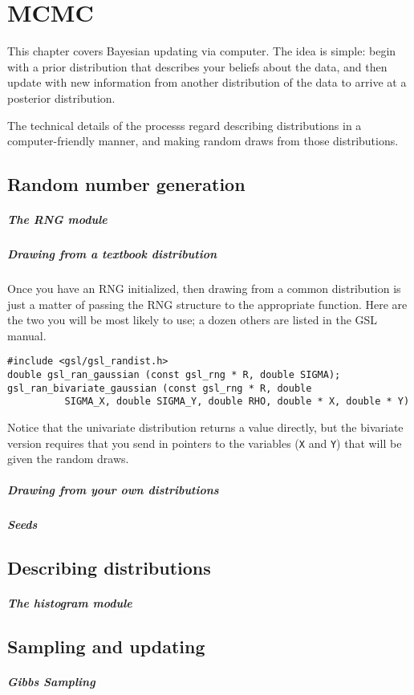 \chapter{MCMC}

This chapter covers Bayesian updating via computer. The idea is simple: begin with a prior
distribution that describes your beliefs about the data, and then update with new
information from another distribution of the data to arrive at a posterior distribution.

The technical details of the processs regard describing distributions
in a computer-friendly manner, and making random draws from those distributions.

\section{Random number generation}

\paragraph{The RNG module}

\paragraph{Drawing from a textbook distribution}
\label{randomnumbers}
Once you have an RNG initialized, then drawing from a common distribution is just a matter
of passing the RNG structure to the appropriate function. Here are the two you will be most
likely to use; a dozen others are listed in the GSL manual.
\begin{verbatim}
#include <gsl/gsl_randist.h>
double gsl_ran_gaussian (const gsl_rng * R, double SIGMA);
gsl_ran_bivariate_gaussian (const gsl_rng * R, double
          SIGMA_X, double SIGMA_Y, double RHO, double * X, double * Y)
\end{verbatim}
Notice that the univariate distribution returns a value directly, but
the bivariate version requires that you send in pointers to the variables
({\tt X} and {\tt Y}) that will be given the random draws.

\paragraph{Drawing from your own distributions}


\paragraph{Seeds}

\section{Describing distributions}

\paragraph{The histogram module}

\section{Sampling and updating}



\paragraph{Gibbs Sampling}

